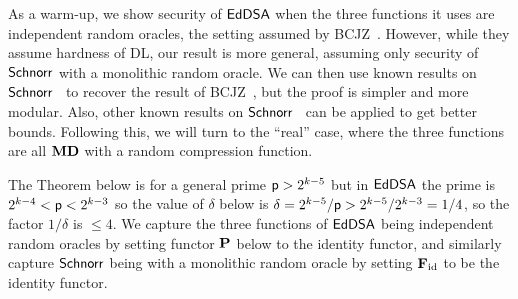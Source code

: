
 As a warm-up, we show security of $\mathsf{EdDSA}$ when the three functions it uses are independent random oracles, the setting assumed by BCJZ~\cite{SP:BCJZ21}. However, while they assume hardness of DL, our result is more general, assuming only security of $\mathsf{Schnorr}$ with a monolithic random oracle. We can then use known results on $\mathsf{Schnorr}$~\cite{JC:PoiSte00,EC:AABN02} to recover the result of BCJZ~\cite{SP:BCJZ21}, but the proof is simpler and more modular. Also, other known results on $\mathsf{Schnorr}$~\cite{C:RotSeg21,INDOCRYPT:BelDai20,EC:FucPloSeu20} can be applied to get better bounds. Following this, we will turn to the ``real'' case, where the three functions are all $\mathbf{MD}$ with a random compression function.

The Theorem below is for a general prime $\mathsf{p} > 2^{k-5}$ but in $\mathsf{EdDSA}$ the prime is $2^{k-4} < \mathsf{p} < 2^{k-3}$ so the value of $\delta$ below is $\delta = 2^{k-5}/\mathsf{p} > 2^{k-5}/2^{k-3} = 1/4$, so the factor $1/\delta$ is $\leq 4$. We capture the three functions of $\mathsf{EdDSA}$ being independent random oracles by setting functor $\mathbf{P}$ below to the identity functor, and similarly capture $\mathsf{Schnorr}$ being with a monolithic random oracle by setting $\mathbf{F}_{\mathrm{id}}$ to be the identity functor. 






